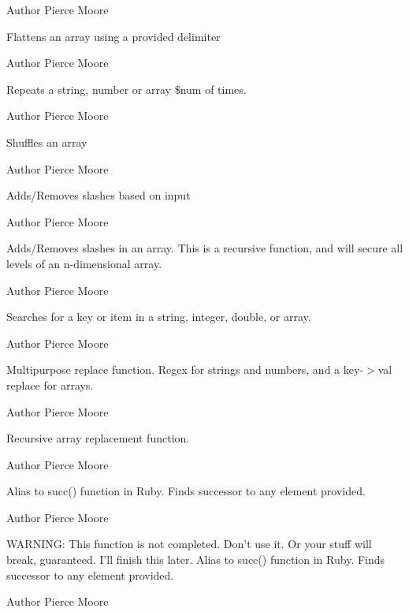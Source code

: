 \begin{DoxyAuthor}{Author}
Pierce Moore
\end{DoxyAuthor}
Flattens an array using a provided delimiter

\begin{DoxyAuthor}{Author}
Pierce Moore
\end{DoxyAuthor}
Repeats a string, number or array \$num of times.

\begin{DoxyAuthor}{Author}
Pierce Moore
\end{DoxyAuthor}
Shuffles an array

\begin{DoxyAuthor}{Author}
Pierce Moore
\end{DoxyAuthor}
Adds/\-Removes slashes based on input

\begin{DoxyAuthor}{Author}
Pierce Moore
\end{DoxyAuthor}
Adds/\-Removes slashes in an array. This is a recursive function, and will secure all levels of an n-\/dimensional array.

\begin{DoxyAuthor}{Author}
Pierce Moore
\end{DoxyAuthor}
Searches for a key or item in a string, integer, double, or array.

\begin{DoxyAuthor}{Author}
Pierce Moore
\end{DoxyAuthor}
Multipurpose replace function. Regex for strings and numbers, and a key-\/$>$val replace for arrays.

\begin{DoxyAuthor}{Author}
Pierce Moore
\end{DoxyAuthor}
Recursive array replacement function.

\begin{DoxyAuthor}{Author}
Pierce Moore
\end{DoxyAuthor}
Alias to succ() function in Ruby. Finds successor to any element provided.

\begin{DoxyAuthor}{Author}
Pierce Moore
\end{DoxyAuthor}
W\-A\-R\-N\-I\-N\-G\-: This function is not completed. Don't use it. Or your stuff will break, guaranteed. I'll finish this later. Alias to succ() function in Ruby. Finds successor to any element provided.

\begin{DoxyAuthor}{Author}
Pierce Moore 
\end{DoxyAuthor}
